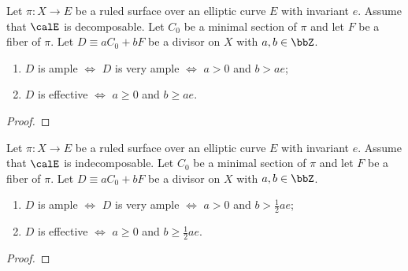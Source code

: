     \begin{theorem}\label{thm:positivity_of_divisors_on_decomposable_ruled_surface_over_elliptic_curve}
        Let \(\pi:X \to E\) be a ruled surface over an elliptic curve \(E\) with invariant \(e\).
        Assume that \(\calE\) is decomposable.
        Let \(C_0\) be a minimal section of \(\pi\) and let \(F\) be a fiber of \(\pi\). 
        Let \(D \equiv aC_0 + bF\) be a divisor on \(X\) with \(a,b \in \bbZ\).
        \begin{enumerate}
            \item \(D\) is ample \(\iff\) \(D\) is very ample \(\iff\) \(a > 0\) and \(b > ae\);
            \item \(D\) is effective \(\iff\) \(a \geq 0\) and \(b \geq ae\).
        \end{enumerate}
    \end{theorem}
    \begin{proof}
    \end{proof}

    \begin{theorem}\label{thm:positivity_of_divisors_on_indecomposable_ruled_surface_over_elliptic_curve}
        Let \(\pi:X \to E\) be a ruled surface over an elliptic curve \(E\) with invariant \(e\).
        Assume that \(\calE\) is indecomposable.
        Let \(C_0\) be a minimal section of \(\pi\) and let \(F\) be a fiber of \(\pi\). 
        Let \(D \equiv aC_0 + bF\) be a divisor on \(X\) with \(a,b \in \bbZ\).
        \begin{enumerate}
            \item \(D\) is ample \(\iff\) \(D\) is very ample \(\iff\) \(a > 0\) and \(b > \frac{1}{2}ae\);
            \item \(D\) is effective \(\iff\) \(a \geq 0\) and \(b \geq \frac{1}{2}ae\).
        \end{enumerate}
    \end{theorem}
    \begin{proof}
    \end{proof}

